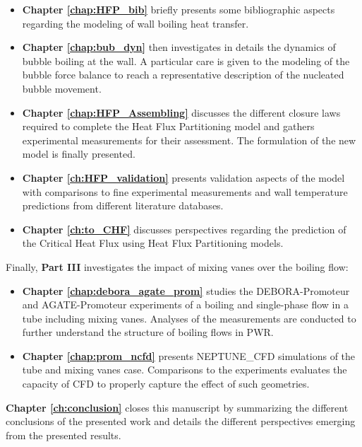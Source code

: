 \begin{itemize}
\item \textbf{Chapter \ref{chap:HFP_bib}} briefly presents some bibliographic aspects regarding the modeling of wall boiling heat transfer.

\item \textbf{Chapter \ref{chap:bub_dyn}} then investigates in details the dynamics of bubble boiling at the wall. A particular care is given to the modeling of the bubble force balance to reach a representative description of the nucleated bubble movement.

\item \textbf{Chapter \ref{chap:HFP_Assembling}} discusses the different closure laws required to complete the Heat Flux Partitioning model and gathers experimental measurements for their assessment. The formulation of the new model is finally presented.

\item \textbf{Chapter \ref{ch:HFP_validation}} presents validation aspects of the model with comparisons to fine experimental measurements and wall temperature predictions from different literature databases.

\item \textbf{Chapter \ref{ch:to_CHF}} discusses perspectives regarding the prediction of the Critical Heat Flux using Heat Flux Partitioning models.
\end{itemize}

Finally, \textbf{Part III} investigates the impact of mixing vanes over the boiling flow:

\begin{itemize}
\item \textbf{Chapter \ref{chap:debora_agate_prom}} studies the DEBORA-Promoteur and AGATE-Promoteur experiments of a boiling and single-phase flow in a tube including mixing vanes. Analyses of the measurements are conducted to further understand the structure of boiling flows in PWR.

\item \textbf{Chapter \ref{chap:prom_ncfd}} presents NEPTUNE\_CFD simulations of the tube and mixing vanes case. Comparisons to the experiments evaluates the capacity of CFD to properly capture the effect of such geometries.
\end{itemize}

\textbf{Chapter \ref{ch:conclusion}} closes this manuscript by summarizing the different conclusions of the presented work and details the different perspectives emerging from the presented results.